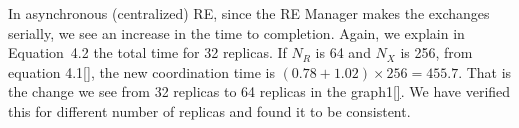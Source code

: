 \documentclass{rspublic}
\newcommand{\jhanote}[1]{ {\textcolor{red} { ***shantenu: #1 }}}
\newcommand{\jhanote}[1]{}
\begin{document}
In asynchronous (centralized) RE, since the RE Manager makes the
exchanges serially, we see an increase in the time to
completion. Again, we explain in Equation~4.2 the total time for 32
replicas.  If $N_R$ is 64 and $N_X$ is 256, from equation 4.1\ref{},
the new coordination time is $(0.78+1.02) \times 256 = 455.7$. That is the
change we see from 32 replicas to 64 replicas in the graph1\ref{}. We
have verified this for different number of replicas and found it to be
consistent.



\end{document}
